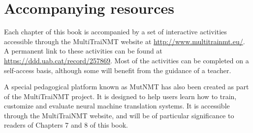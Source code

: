 \documentclass[output=paper]{langscibook}
\begin{document}
\section*{Accompanying resources}
Each chapter of this book is accompanied by a set of interactive activities accessible through the MultiTraiNMT website at \url{http://www.multitrainmt.eu/}. A permanent link to these activities can be found at \url{https://ddd.uab.cat/record/257869}. Most of the activities can be completed on a self-access basis, although some will benefit from the guidance of a teacher.

A special pedagogical platform known as MutNMT has also been created as part of the MultiTraiNMT project. It is designed to help users learn how to train, customize and evaluate neural machine translation systems. It is accessible through the MultiTraiNMT website, and will be of particular significance to readers of Chapters 7 and 8 of this book.

\printbibliography[heading=subbibliography,notkeyword=this]
\end{document}
